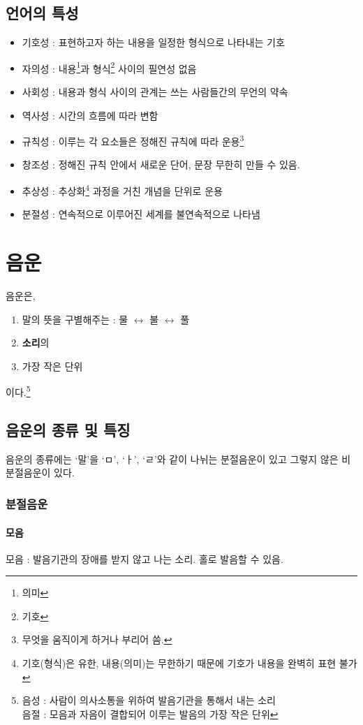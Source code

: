 \documentclass[10pt]{report}
\newcommand{\tl}{\textquoteleft}
\newcommand{\tr}{\textquoteright}
\begin{document}
\section{언어의 특성}
\begin{itemize}
\item 기호성 : 표현하고자 하는 내용을 일정한 형식으로 나타내는 기호
\item 자의성 : 내용\footnote{의미}과 형식\footnote{기호} 사이의 필연성 없음
\item 사회성 : 내용과 형식 사이의 관계는 쓰는 사람들간의 무언의 약속
\item 역사성 : 시간의 흐름에 따라 변함
\item 규칙성 : 이루는 각 요소들은 정해진 규칙에 따라 운용\footnote{무엇을 움직이게 하거나 부리어 씀.}
\item 창조성 : 정해진 규칙 안에서 새로운 단어, 문장 무한히 만들 수 있음.
\item 추상성 : 추상화\footnote{기호(형식)은 유한, 내용(의미)는 무한하기 때문에 기호가 내용을 완벽히 표현 불가} 과정을 거친 개념을 단위로 운용
\item 분절성 : 연속적으로 이루어진 세계를 불연속적으로 나타냄

\end{itemize}
\chapter{음운}
음운은, 
\begin{enumerate}
\item 말의 뜻을 구별해주는 : 물 $\leftrightarrow$ 불 $\leftrightarrow$ 풀
\item \textbf{소리}의
\item 가장 작은 단위
\end{enumerate}
이다.\footnote{음성 : 사람이 의사소통을 위하여 발음기관을 통해서 내는 소리 \\ 음절 : 모음과 자음이 결합되어 이루는 발음의 가장 작은 단위}

\section{음운의 종류 및 특징}
음운의 종류에는 \tl 말\tr 을 \tl ㅁ\tr, \tl ㅏ\tr, \tl ㄹ\tr 와 같이 나뉘는 분절음운이 있고 그렇지 않은 비분절음운이 있다.
\subsection{분절음운}
\subsubsection{모음}
\begin{center}
모음 : 발음기관의 장애를 받지 않고 나는 소리. 홀로 발음할 수 있음.
\end{center}
\end{document}
